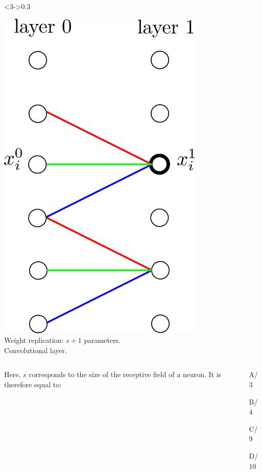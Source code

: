 \documentclass[xcolor=pdftex,dvipsnames,table,mathserif]{beamer}
\begin{document}
{\begin{columns}
    \begin{column}<3->{0.3\textwidth}
      \begin{center}
        \includegraphics[width=0.74\textwidth]{convolutional_layer.png}
        \\ \scriptsize{Weight replication: $s+1$ parameters.\\
          \alert{Convolutional layer.}}
      \end{center}
    \end{column}

  \end{columns}

  \pause

  \begin{columns}
    \begin{column}{.5\textwidth}
  Here, $s$ corresponds to the size of the receptive field of a neuron. It is therefore equal to:

    \end{column}

    \begin{column}{.5\textwidth}
    \begin{itemize}
  \item[A/] $3$
  \item[B/] $4$
  \item[C/] $9$
  \item[D/] $10$
  \end{itemize}

    \end{column}
  \end{columns}





}
\end{document}
